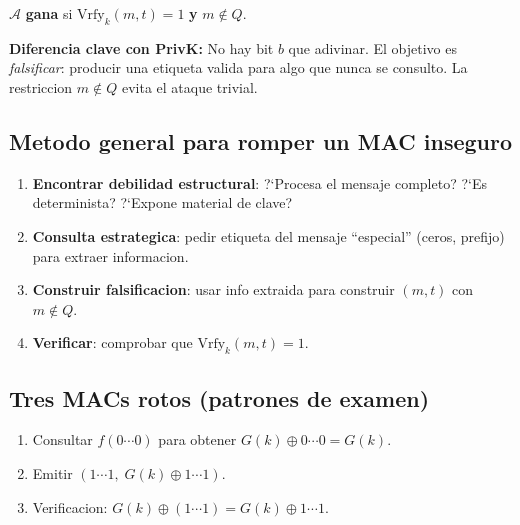 \documentclass[a4paper,11pt]{article}
\begin{document}
\vspace{0.3cm}
$\mathcal{A}$ \textbf{gana} si $\mathrm{Vrfy}_k(m, t) = 1$ \textbf{y} $m \notin Q$.

\vspace{0.3cm}
\noindent\textbf{Diferencia clave con PrivK:} No hay bit $b$ que adivinar. El objetivo es \emph{falsificar}: producir una etiqueta valida para algo que nunca se consulto. La restriccion $m \notin Q$ evita el ataque trivial.

\subsection{Metodo general para romper un MAC inseguro}

\begin{enumerate}[leftmargin=*, label=\textbf{Paso \arabic*.}]
  \item \textbf{Encontrar debilidad estructural}: ?`Procesa el mensaje completo? ?`Es determinista? ?`Expone material de clave?
  \item \textbf{Consulta estrategica}: pedir etiqueta del mensaje ``especial'' (ceros, prefijo) para extraer informacion.
  \item \textbf{Construir falsificacion}: usar info extraida para construir $(m, t)$ con $m \notin Q$.
  \item \textbf{Verificar}: comprobar que $\mathrm{Vrfy}_k(m, t) = 1$.
\end{enumerate}

\subsection{Tres MACs rotos (patrones de examen)}

\begin{attackbox}[title={Patron de Ataque -- MAC 1: $\mathrm{Mac}_k(m) = G(k) \oplus m$}]
\begin{enumerate}[leftmargin=*, label=\textbf{\arabic*.}]
  \item Consultar $f(0\cdots0)$ para obtener $G(k) \oplus 0\cdots0 = G(k)$.
  \item Emitir $(1\cdots1,\; G(k) \oplus 1\cdots1)$.
  \item Verificacion: $G(k) \oplus (1\cdots1) = G(k) \oplus 1\cdots1$. \checkmark
\end{enumerate}
\end{attackbox}

\vspace{0.3cm}
\end{document}
